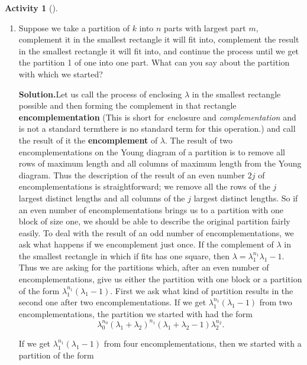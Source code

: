 \documentclass[10pt,]{book}
\newcommand{\terminology}[1]{\textbf{#1}}
\theoremstyle{plain}
\theoremstyle{definition}
\newtheorem{activity}[project]{Activity}
\numberwithin{equation}{chapter}
\begin{document}
\begin{activity}[]\label{activity-143}
~\par
\begin{enumerate}[label=(\alph*)]
 \item Suppose we take a partition of \(k\) into \(n\) parts with largest part \(m\), complement it in the smallest rectangle it will fit into, complement the result in the smallest rectangle it will fit into, and continue the process until we get the partition 1 of one into one part.  What can you say about the partition with which we started?%
\par\medskip\noindent%
\textbf{Solution.}\quad Let us call the process of enclosing \(\lambda\) in the smallest rectangle possible and then forming the complement in that rectangle \terminology{encomplementation} (This is short for \emph{en}\/closure and \emph{complementation} and is not a standard term\textemdash{}there is no standard term for this operation.) and call the result of it the \terminology{encomplement} of \(\lambda\).  The result of two encomplementations on the Young diagram of a partition is to remove all rows of maximum length and all columns of maximum length from the Young diagram. Thus the description of the result of an even number \(2j\) of encomplementations is straightforward; we remove all the rows of the \(j\) largest distinct lengths and all columns of the \(j\) largest distinct lengths. So if an even number of encomplementations brings us to a partition with one block of size one, we should be able to describe the original partition fairly easily. To deal with the result of an odd number of encomplementations, we ask what happens if we encomplement just once.  If the complement of \(\lambda\) in the smallest rectangle in which if fits has one square, then \(\lambda =\lambda_1^{n_1}\lambda_1-1\). Thus we are asking for the partitions which, after an even number of encomplementations, give us either the partition with one block or a partition of the form \(\lambda_1^{n_1}(\lambda_1-1)\). First we ask what kind of partition results in the second one after two encomplementations. If we get \(\lambda_1^{n_1}(\lambda_1-1)\) from two encomplementations, the partition we started with had the form%
\begin{equation*}
\lambda_0^{n_0}(\lambda_1+\lambda_{2})^{n_1}(\lambda_1+
\lambda_2-1)\lambda_2^{n_2}.
\end{equation*}
%
\par
If we get \(\lambda_1^{n_1}(\lambda_1-1)\) from four encomplementations, then we started with a partition of the form%

\end{enumerate}
\end{activity}
\end{document}
